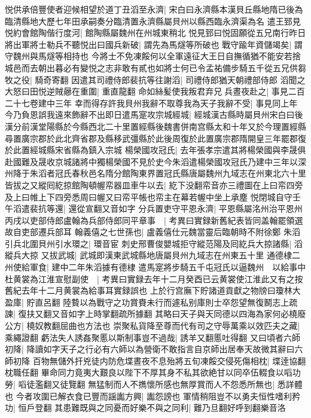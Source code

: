 悦供承倍豐使者迎候相望於道丁丑滔至永濟|{
	宋白曰永濟縣本漢貝丘縣地隋已後為臨清縣地大歷七年田承嗣奏分臨清置永濟縣屬貝州以縣西臨永濟渠為名}
遣王郅見悦約會館陶偕行度河|{
	館陶縣屬魏州在州城東稍北}
悦見郅曰悦固願從五兄南行昨日將出軍將士勒兵不聽悦出曰國兵新破|{
	謂先為馬燧等所破也}
戰守踰年資儲竭矣|{
	謂守魏州與馬燧等相持也}
今將士不免凍餒何以全軍遠征大王日自撫循猶不能安若捨城邑而去朝出暮必有變悦之志非敢有貳也如將士何已令孟祐備步騎五千從五兄供芻牧之役|{
	騎奇寄翻}
因遣其司禮侍郎裴抗等往謝滔|{
	司禮侍郎猶天朝禮部侍郎}
滔聞之大怒曰田悦逆賊曏在重圍|{
	重直龍翻}
命如絲髪使我叛君弃兄兵晝夜赴之|{
	事見二百二十七卷建中三年}
幸而得存許我貝州我辭不取尊我為天子我辭不受|{
	事見同上年}
今乃負恩誤我遠來飾辭不出即日遣馬寔攻宗城經城|{
	經城漢古縣時屬貝州宋白曰後漢分前漢堂陽縣於今縣西北二十里置經縣後魏書併南宫縣太和十年又於今理置經縣尋置廣宗郡於此北齊省郡及縣移武彊縣於此後周復於此置廣宗郡隋開皇三年罷郡復於此置經城縣宋省縣為鎮入宗城}
楊榮國攻冠氏|{
	去年張孝宗遣其將楊榮國與李晟俱赴國難及晟收京城諸將中獨楊榮國不見於史今朱滔遣楊榮國攻冠氏乃建中三年以深州降于朱滔者冠氏春秋邑名隋分館陶東界置冠氏縣唐屬魏州九域志在州東北六十里}
皆拔之又縱囘紇掠館陶頓幄帟器皿車牛以去|{
	紇下没翻帟音亦三禮圖在上曰帟四旁及上曰帷上下四旁悉周曰幄又曰帟平帳也帟主在幕若幄中坐上承塵}
悦閉城自守壬午滔遣裴抗等還|{
	還從宣翻又音如字}
分兵置吏守平恩永濟|{
	平恩縣屬洺州治平恩州}
丙戌以吏部侍郎盧翰為兵部侍郎同平章事　|{
	考異曰實録新舊紀表皆同盖翰罷領選故自吏部遷兵部耳}
翰義僖之七世孫也|{
	盧義僖仕元魏當靈后臨朝時不附徐鄭}
朱滔引兵北圍貝州引水環之|{
	環音宦}
刺史邢曹俊嬰城拒守縱范陽及囘紇兵大掠諸縣|{
	滔縱兵大掠}
又拔武城|{
	武城即漢東武城縣地唐屬貝州九域志在州東五十里}
通德棣二州使給軍食|{
	建中二年朱滔據有德棣}
遣馬寔將步騎五千屯冠氏以逼魏州　以給事中杜黄裳為江淮宣慰副使　|{
	考異曰實録去年十二月癸酉已云黄裳使江淮此又有之按舊紀去年十二月黄裳為給事耳實録誤也}
上於行宫廡下貯諸道貢獻之物牓曰瓊林大盈庫|{
	貯直呂翻}
陸䞇以為戰守之功賞賚未行而遽私别庫則士卒怨望無復鬭志上疏諫|{
	復扶又翻又音如字上時掌翻疏所據翻}
其略曰天子與天同德以四海為家何必橈廢公方|{
	橈奴教翻屈曲也方法也}
崇聚私貨降至尊而代有司之守辱萬乘以效匹夫之藏|{
	乘繩證翻}
虧法失人誘姦聚慝以斯制事豈不過哉|{
	誘羊又翻慝吐得翻}
又曰頃者六師初降|{
	降讀如字天子之行必有六師以為營衛不敢指言自京師出居奉天故微其辭曰六師初降}
百物無儲外扞兇徒内防危堞晝夜不息殆將五旬凍餒交侵死傷相枕|{
	堞逹協翻枕職任翻}
畢命同力竟夷大艱良以陛下不厚其身不私其欲絶甘以同卒伍輟食以㗖功勞|{
	㗖徒濫翻又徒覽翻}
無猛制而人不擕懷所感也無厚賞而人不怨悉所無也|{
	悉詳體也}
今者攻圍已解衣食已豐而謡讟方興|{
	讟怨謗也}
軍情稍阻豈不以勇夫恒性嗜利矜功|{
	恒戶登翻}
其患難既與之同憂而好樂不與之同利|{
	難乃旦翻好呼到翻樂音洛}
